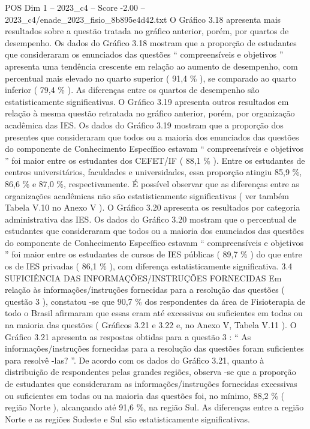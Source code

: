 \begin{textsample}{POS Dim 1 – 2023\_c4 – Score -2.00 – 2023\_c4/enade\_2023\_fisio\_8b895e4d42.txt}
O Gráfico 3.18 apresenta mais resultados sobre a questão tratada no gráfico anterior, porém, por quartos de desempenho.
Os dados do Gráfico 3.18 mostram que a proporção de estudantes que consideraram os enunciados das questões “ compreensíveis e objetivos ” apresenta uma tendência crescente em relação ao aumento de desempenho, com percentual mais elevado no quarto superior ( 91,4 \% ), se comparado ao quarto inferior ( 79,4 \% ).
As diferenças entre os quartos de desempenho são estatisticamente significativas.
O Gráfico 3.19 apresenta outros resultados em relação à mesma questão retratada no gráfico anterior, porém, por organização acadêmica das IES.
Os dados do Gráfico 3.19 mostram que a proporção dos presentes que consideraram que todos ou a maioria dos enunciados das questões do componente de Conhecimento Específico estavam “ compreensíveis e objetivos ” foi maior entre os estudantes dos CEFET/IF ( 88,1 \% ).
Entre os estudantes de centros universitários, faculdades e universidades, essa proporção atingiu 85,9 \%, 86,6 \% e 87,0 \%, respectivamente.
É possível observar que as diferenças entre as organizações acadêmicas não são estatisticamente significativas ( ver também Tabela V.10 no Anexo V ).
O Gráfico 3.20 apresenta os resultados por categoria administrativa das IES.
Os dados do Gráfico 3.20 mostram que o percentual de estudantes que consideraram que todos ou a maioria dos enunciados das questões do componente de Conhecimento Específico estavam “ compreensíveis e objetivos ” foi maior entre os estudantes de cursos de IES públicas ( 89,7 \% ) do que entre os de IES privadas ( 86,1 \% ), com diferença estatisticamente significativa. 3.4 SUFICIÊNCIA DAS INFORMAÇÕES/INSTRUÇÕES FORNECIDAS Em relação às informações/instruções fornecidas para a resolução das questões ( questão 3 ), constatou -se que 90,7 \% dos respondentes da área de Fisioterapia de todo o Brasil afirmaram que essas eram até excessivas ou suficientes em todas ou na maioria das questões ( Gráficos 3.21 e 3.22 e, no Anexo V, Tabela V.11 ).
O Gráfico 3.21 apresenta as respostas obtidas para a questão 3 : “ As informações/instruções fornecidas para a resolução das questões foram suficientes para resolvê -las? ”.
De acordo com os dados do Gráfico 3.21, quanto à distribuição de respondentes pelas grandes regiões, observa -se que a proporção de estudantes que consideraram as informações/instruções fornecidas excessivas ou suficientes em todas ou na maioria das questões foi, no mínimo, 88,2 \% ( região Norte ), alcançando até 91,6 \%, na região Sul.
As diferenças entre a região Norte e as regiões Sudeste e Sul são estatisticamente significativas.

\end{textsample}

